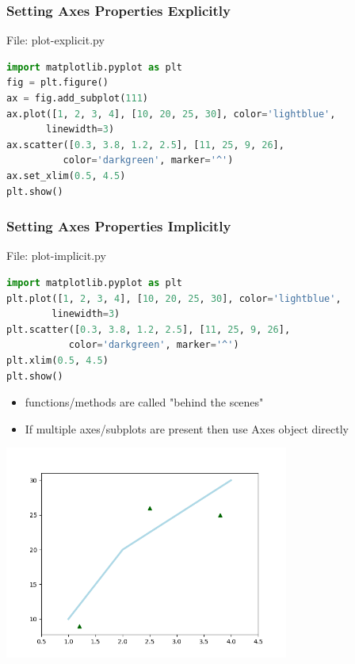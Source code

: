 \begin{frame}[fragile]
	\frametitle{Setting Axes Properties Explicitly}
    \begin{block}{File: plot-explicit.py}
    \begin{lstlisting}[language=Python]
import matplotlib.pyplot as plt
fig = plt.figure()
ax = fig.add_subplot(111)
ax.plot([1, 2, 3, 4], [10, 20, 25, 30], color='lightblue',
       linewidth=3)
ax.scatter([0.3, 3.8, 1.2, 2.5], [11, 25, 9, 26], 
          color='darkgreen', marker='^')
ax.set_xlim(0.5, 4.5)
plt.show()
    \end{lstlisting}      
		\end{block}		
\end{frame}

\begin{frame}[fragile]
	\frametitle{Setting Axes Properties Implicitly}
    \begin{block}{File: plot-implicit.py}
    \begin{lstlisting}[language=Python]
import matplotlib.pyplot as plt		
plt.plot([1, 2, 3, 4], [10, 20, 25, 30], color='lightblue',
        linewidth=3)
plt.scatter([0.3, 3.8, 1.2, 2.5], [11, 25, 9, 26], 
           color='darkgreen', marker='^')
plt.xlim(0.5, 4.5)
plt.show()
    \end{lstlisting}      
		\end{block}
    \begin{itemize}
      \item {} functions/methods are called "behind the scenes"
      \item If multiple axes/subplots are present then use Axes object directly			
    \end{itemize}		
\end{frame}

\begin{frame}[fragile]
   \vspace{-1cm}
    \begin{center}
      \includegraphics[width=0.7\textwidth]{screenshots/fig-ex-1.png}
    \end{center}						
\end{frame}

